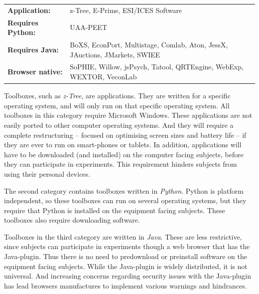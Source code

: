 \documentclass[preprint, 12pt]{elsarticle}
\begin{document}
\begin{table}[h!]
\begin{tabular}{ l p{} }
{\bf Application:} & z-Tree, E-Prime, ESI/ICES Software \\
{\bf Requires Python:} & UAA-PEET \\
{\bf Requires Java:} & BoXS, EconPort, Multistage, Comlab, Aton, JessX, JAuctions, JMarkets, SWIEE \\
{\bf Browser native:} & SoPHIE, Willow, jsPsych, Tatool, QRTEngine, WebExp, WEXTOR, VeconLab \\
\end{tabular}
\end{table}

Toolboxes, such as \emph{z-Tree}, are applications. They are written for a specific operating system, and will only run on that specific operating system. All toolboxes in this category require Microsoft Windows. These applications are not easily ported to other computer operating systems. And they will require a complete restructuring -- focused on optimising screen sizes and battery life -- if they are ever to run on smart-phones or tablets. In addition, applications will have to be downloaded (and installed) on the computer facing subjects, before they can participate in experiments. This requirement hinders subjects from using their personal devices.

The second category contains toolboxes written in \emph{Python}. Python is platform independent, so these toolboxes can run on several operating systems, but they require that Python is installed on the equipment facing subjects\footnotemark[2]. These toolboxes also require downloading software.


Toolboxes in the third category are written in \emph{Java}. These are less restrictive, since subjects can participate in experiments though a web browser that has the Java-plugin. Thus there is no need to predownload or preinstall software on the equipment facing subjects. While the Java-plugin is widely distributed, it is not universal\footnotemark[3]. And increasing concerns regarding security issues with the Java-plugin has lead browsers manufactures to implement various warnings and hindrances\footnotemark[4]. 

 
\end{document}
